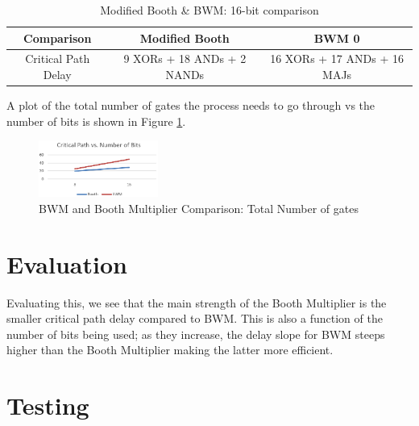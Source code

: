 \documentclass[journal]{IEEEtran}
\begin{document}
\begin{table}[!h]
\renewcommand{\arraystretch}{1.2}
\caption{Modified Booth \& BWM: 16-bit comparison}
\label{tab:t9}
\centering
\begin{tabular}{| c | c | c | }
\hline
\textbf{Comparison} & \textbf{Modified Booth} & 
\textbf{BWM} 0\\\hline
Critical Path Delay & 9 XORs + 18 ANDs + 2 NANDs 
& 16 XORs + 17 ANDs + 16 MAJs\\\hline
\end{tabular}
\end{table}


A plot of the total number of gates the process needs to go through vs the number of bits is shown in Figure \ref{fig:14}.

\begin{figure}[h!]
  \centering
  \includegraphics[width=0.35\textwidth]{14.png}
  \centering
  \caption{BWM and Booth Multiplier Comparison: Total Number of gates}
  \label{fig:14}
\end{figure}

\vspace{-5pt}

\section{Evaluation}

Evaluating this, we see that the main strength of the Booth Multiplier is the smaller critical path delay compared to BWM. 
This is also a function of the number of bits being used; as they increase, the delay slope 
for BWM steeps higher than the Booth Multiplier making the latter more efficient.



\section{Testing}
\end{document}
